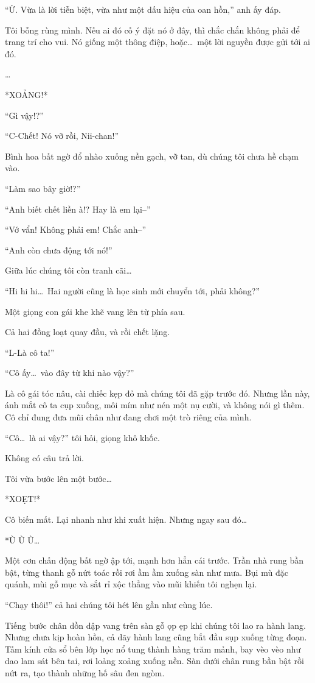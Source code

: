 \documentclass[../main.tex]{subfiles}
\begin{document}
``Ừ. Vừa là lời tiễn biệt, vừa như một dấu hiệu của oan hồn,'' anh ấy đáp.

Tôi bỗng rùng mình. Nếu ai đó cố ý đặt nó ở đây, thì chắc chắn không phải để trang trí cho vui. Nó giống một thông điệp, hoặc\dots\ một lời nguyền được gửi tới ai đó.

\dots

*XOẢNG!*

``Gì vậy!?''

``C-Chết! Nó vỡ rồi, Nii-chan!''

Bình hoa bất ngờ đổ nhào xuống nền gạch, vỡ tan, dù chúng tôi chưa hề chạm vào.

``Làm sao bây giờ!?''

``Anh biết chết liền à!? Hay là em lại--''

``Vớ vẩn! Không phải em! Chắc anh--''

``Anh còn chưa động tới nó!''

Giữa lúc chúng tôi còn tranh cãi\dots

``Hi hi hi\dots\ Hai người cũng là học sinh mới chuyển tới, phải không?''

Một giọng con gái khe khẽ vang lên từ phía sau.

Cả hai đồng loạt quay đầu, và rồi chết lặng.

``L-Là cô ta!''

``Cô ấy\dots\ vào đây từ khi nào vậy?''

Là cô gái tóc nâu, cài chiếc kẹp đỏ mà chúng tôi đã gặp trước đó. Nhưng lần này, ánh mắt cô ta cụp xuống, môi mím như nén một nụ cười, và không nói gì thêm. Cô chỉ đung đưa mũi chân như đang chơi một trò riêng của mình.

``Cô\dots\ là ai vậy?'' tôi hỏi, giọng khô khốc.

Không có câu trả lời.

Tôi vừa bước lên một bước\dots

*XOẸT!*

Cô biến mất. Lại nhanh như khi xuất hiện. Nhưng ngay sau đó\dots

*Ù Ù Ù\dots*

Một cơn chấn động bất ngờ ập tới, mạnh hơn hẳn cái trước. Trần nhà rung bần bật, từng thanh gỗ nứt toác rồi rơi ầm ầm xuống sàn như mưa. Bụi mù đặc quánh, mùi gỗ mục và sắt rỉ xộc thẳng vào mũi khiến tôi nghẹn lại.

``Chạy thôi!'' cả hai chúng tôi hét lên gần như cùng lúc.

Tiếng bước chân dồn dập vang trên sàn gỗ ọp ẹp khi chúng tôi lao ra hành lang. Nhưng chưa kịp hoàn hồn, cả dãy hành lang cũng bắt đầu sụp xuống từng đoạn. Tấm kính cửa sổ bên lớp học nổ tung thành hàng trăm mảnh, bay vèo vèo như dao lam sát bên tai, rơi loảng xoảng xuống nền. Sàn dưới chân rung bần bật rồi nứt ra, tạo thành những hố sâu đen ngòm.
\end{document}
